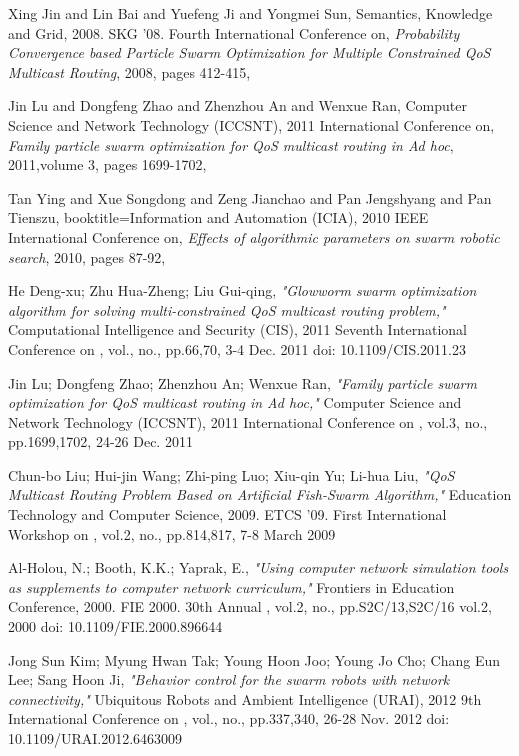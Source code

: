 \documentclass[journal]{IEEEtran}
\begin{document}
\ifCLASSOPTIONcaptionsoff
  \newpage
\fi
\begin{thebibliography}{1}

Xing Jin and Lin Bai and Yuefeng Ji and Yongmei Sun,
Semantics, Knowledge and Grid, 2008. SKG '08. Fourth International Conference on, \emph{Probability Convergence based Particle Swarm Optimization for Multiple Constrained QoS Multicast Routing},
2008, pages 412-415,

Jin Lu and Dongfeng Zhao and Zhenzhou An and Wenxue Ran,
Computer Science and Network Technology (ICCSNT), 2011 International Conference on, \emph{Family particle swarm optimization for QoS multicast routing in Ad hoc},
2011,volume 3, pages 1699-1702,

Tan Ying and Xue Songdong and Zeng Jianchao and Pan Jengshyang and Pan Tienszu,
booktitle={Information and Automation (ICIA), 2010 IEEE International Conference on}, \emph{Effects of algorithmic parameters on swarm robotic search},
2010, pages 87-92,

He Deng-xu; Zhu Hua-Zheng; Liu Gui-qing, \emph{"Glowworm swarm optimization algorithm for solving multi-constrained QoS multicast routing problem,"} Computational Intelligence and Security (CIS), 2011 Seventh International Conference on , vol., no., pp.66,70, 3-4 Dec. 2011
doi: 10.1109/CIS.2011.23

Jin Lu; Dongfeng Zhao; Zhenzhou An; Wenxue Ran, \emph{"Family particle swarm optimization for QoS multicast routing in Ad hoc,"} Computer Science and Network Technology (ICCSNT), 2011 International Conference on , vol.3, no., pp.1699,1702, 24-26 Dec. 2011

Chun-bo Liu; Hui-jin Wang; Zhi-ping Luo; Xiu-qin Yu; Li-hua Liu, \emph{"QoS Multicast Routing Problem Based on Artificial Fish-Swarm Algorithm,"} Education Technology and Computer Science, 2009. ETCS '09. First International Workshop on , vol.2, no., pp.814,817, 7-8 March 2009

Al-Holou, N.; Booth, K.K.; Yaprak, E., \emph{"Using computer network simulation tools as supplements to computer network curriculum,"} Frontiers in Education Conference, 2000. FIE 2000. 30th Annual , vol.2, no., pp.S2C/13,S2C/16 vol.2, 2000
doi: 10.1109/FIE.2000.896644

Jong Sun Kim; Myung Hwan Tak; Young Hoon Joo; Young Jo Cho; Chang Eun Lee; Sang Hoon Ji, \emph{"Behavior control for the swarm robots with network connectivity,"} Ubiquitous Robots and Ambient Intelligence (URAI), 2012 9th International Conference on , vol., no., pp.337,340, 26-28 Nov. 2012
doi: 10.1109/URAI.2012.6463009

\end{thebibliography}
\end{document}
